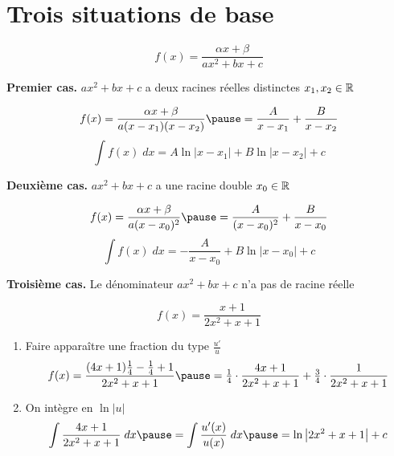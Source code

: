 \section*{Trois situations de base}


\begin{frame}

$$f(x)=\frac{\alpha x + \beta}{a x^2+b x+c}$$
\medskip

\pause

\textbf{Premier cas.} $a x^2+b x+c$ a deux racines réelles distinctes $x_1,x_ 2\in \mathbb{R}$

\pause

$$f(x)=\frac{\alpha x + \beta}{a(x - x_1)(x - x_2)}
\pause
=\frac{A}{x - x_1}+\frac{B}{x -x_2}$$
\pause
$$\int f(x)\;dx = A \ln|x - x_1|+B\ln|x -x_2|+c$$ 
\pause
\medskip

\textbf{Deuxième cas.} $a x^2+b x+c$ a une racine double $x_0 \in \mathbb{R}$

\pause

$$f(x)=\frac{\alpha x + \beta}{a(x -x_0)^2}
\pause
=\frac{A}{(x - x_0)^2}+\frac{B}{x - x_0}$$
\pause
$$\int f(x)\;dx = -\frac{A}{x - x_0} + B\ln|x - x_0|+c$$ 

\end{frame}




\begin{frame}

\textbf{Troisième cas.} Le dénominateur $a x^2+b x+c$ n'a pas de racine réelle
\pause
\begin{exemple}
$$f(x)=\frac{x+1}{2x^2+x+1}$$

\pause

\begin{enumerate}
  \item Faire apparaître une fraction du type $\frac{u'}{u}$ 
\pause
$$f(x) = \frac{(4x+1)\frac14-\frac14+1}{2x^2+x+1} 
\pause
= \tfrac14 \cdot \frac{4x+1}{2x^2+x+1} + \tfrac34 \cdot \frac{1}{2x^2+x+1}$$

\pause

  \item On intègre en $\ln|u|$
\pause
$$\int \frac{4x+1}{2x^2+x+1} \; dx \pause= \int \frac{u'(x)}{u(x)} \; dx \pause = \ln \big| 2x^2+x+1 \big|+c$$

\setcounter{saveenumi}{\theenumi}

\end{enumerate}
\end{exemple}
\end{frame}


